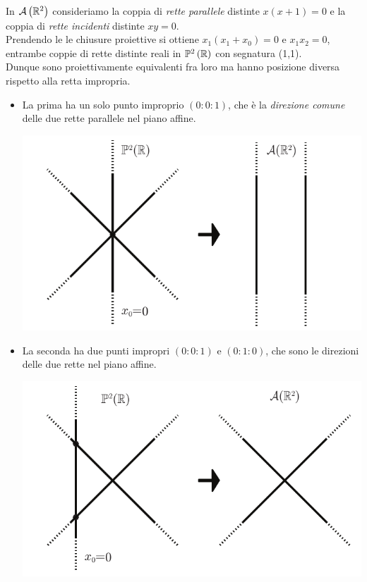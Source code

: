 \begin{example}
	In ${\mathcal{A}\left(\mathbb{R}^2\right)}$ consideriamo la coppia di \textit{rette parallele} distinte $x(x+1)=0$ e la coppia di \textit{rette incidenti} distinte $xy=0$.\\
	Prendendo le le chiusure proiettive si ottiene $x_1(x_1+x_0)=0$ e $x_1x_2=0$, entrambe coppie di rette distinte reali in $\proj[2]{\realset}$ con segnatura (1,1). \\
	Dunque sono proiettivamente equivalenti fra loro ma hanno posizione diversa rispetto alla retta impropria.
	\begin{itemize}
		\item La prima ha un solo punto improprio $(0\colon 0\colon 1)$, che è la \textit{direzione comune} delle due rette parallele nel piano affine.
		\begin{center}
			\includegraphics[trim=0cm 0cm 0cm 0cm,clip,scale=0.50]{images/projlineintersect1.pdf}
		\end{center}
		\item La seconda ha due punti impropri $(0\colon 0\colon 1)$ e $(0\colon 1\colon 0)$, che sono le direzioni delle due rette nel piano affine.
		\begin{center}
			\includegraphics[trim=0cm 0cm 0cm 0cm,clip,scale=0.50]{images/projlineintersect2.pdf}
		\end{center}
	\end{itemize}
\vspace{-3mm}
\end{example}
